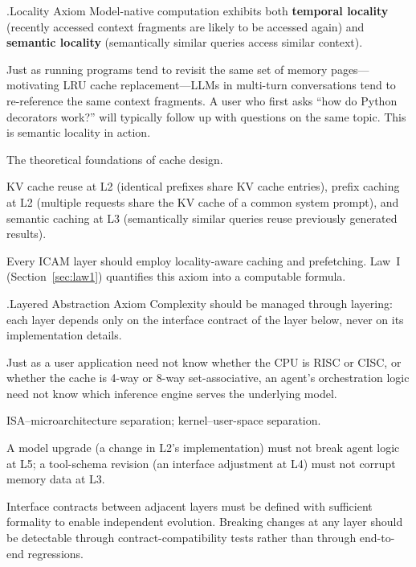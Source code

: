 \documentclass[11pt,a4paper]{article}
\newcounter{axiom}[section]
\renewcommand{\theaxiom}{\thesection.\arabic{axiom}}
\begin{document}
\begin{axiombox}{\theaxiom\enspace Locality Axiom}
Model-native computation exhibits both \textbf{temporal locality} (recently accessed context fragments are likely to be accessed again) and \textbf{semantic locality} (semantically similar queries access similar context).
\end{axiombox}
\begin{description}[style=nextline,leftmargin=2em,font=\bfseries]
\item[Intuition] Just as running programs tend to revisit the same set of memory pages---motivating LRU cache replacement---LLMs in multi-turn conversations tend to re-reference the same context fragments. A user who first asks ``how do Python decorators work?'' will typically follow up with questions on the same topic. This is semantic locality in action.
\item[Classical source] The theoretical foundations of cache design\cite{drepper2007memory}.
\item[ICAM embodiment] KV cache reuse at L2 (identical prefixes share KV cache entries), prefix caching at L2 (multiple requests share the KV cache of a common system prompt), and semantic caching at L3 (semantically similar queries reuse previously generated results).
\item[Design implication] Every ICAM layer should employ locality-aware caching and prefetching. Law~I (Section~\ref{sec:law1}) quantifies this axiom into a computable formula.
\end{description}

\begin{axiombox}{\theaxiom\enspace Layered Abstraction Axiom}
Complexity should be managed through layering: each layer depends only on the interface contract of the layer below, never on its implementation details.
\end{axiombox}
\begin{description}[style=nextline,leftmargin=2em,font=\bfseries]
\item[Intuition] Just as a user application need not know whether the CPU is RISC or CISC, or whether the cache is 4-way or 8-way set-associative, an agent's orchestration logic need not know which inference engine serves the underlying model.
\item[Classical source] ISA--microarchitecture separation; kernel--user-space separation\cite{hennessy2017quantitative,ostep_2023}.
\item[ICAM embodiment] A model upgrade (a change in L2's implementation) must not break agent logic at L5; a tool-schema revision (an interface adjustment at L4) must not corrupt memory data at L3.
\item[Design implication] Interface contracts between adjacent layers must be defined with sufficient formality to enable independent evolution. Breaking changes at any layer should be detectable through contract-compatibility tests rather than through end-to-end regressions.
\end{description}
\end{document}
